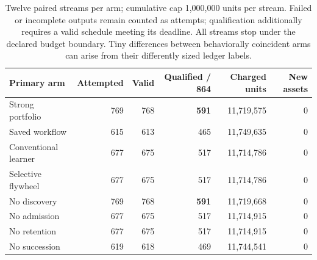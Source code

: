 \begin{table}[ht]\centering\small
\begin{tabularx}{\linewidth}{Yrrrrr}
\toprule
Primary arm & Attempted & Valid & Qualified / 864 & Charged units & New assets \\
\midrule
Strong portfolio & 769 & 768 & \textbf{591} & 11,719,575 & 0 \\
Saved workflow & 615 & 613 & 465 & 11,749,635 & 0 \\
Conventional learner & 677 & 675 & 517 & 11,714,786 & 0 \\
Selective flywheel & 677 & 675 & 517 & 11,714,786 & 0 \\
No discovery & 769 & 768 & \textbf{591} & 11,719,668 & 0 \\
No admission & 677 & 675 & 517 & 11,714,915 & 0 \\
No retention & 677 & 675 & 517 & 11,714,915 & 0 \\
No succession & 619 & 618 & 469 & 11,744,541 & 0 \\
\bottomrule
\end{tabularx}
\caption{Twelve paired streams per arm; cumulative cap 1,000,000 units per stream. Failed or incomplete outputs remain counted as attempts; qualification additionally requires a valid schedule meeting its deadline. All streams stop under the declared budget boundary. Tiny differences between behaviorally coincident arms can arise from their differently sized ledger labels.}
\end{table}
